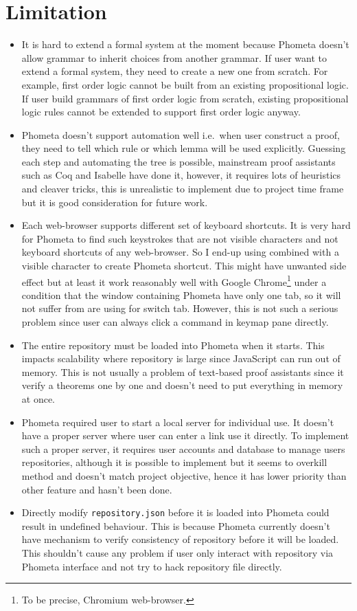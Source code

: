 \documentclass[master.tex]{subfiles}
\begin{document}
\section{Limitation}

\begin{itemize}
\item It is hard to extend a formal system at the moment because Phometa doesn't
  allow grammar to inherit choices from another grammar. If user want to extend
  a formal system, they need to create a new one from scratch. For example,
  first order logic cannot be built from an existing propositional logic. If
  user build grammars of first order logic from scratch, existing propositional
  logic rules cannot be extended to support first order logic anyway.
\item Phometa doesn't support automation well i.e.\ when user construct a proof,
  they need to tell which rule or which lemma will be used explicitly. Guessing
  each step and automating the tree is possible, mainstream proof assistants
  such as Coq and Isabelle have done it, however, it requires lots of heuristics
  and cleaver tricks, this is unrealistic to implement due to project time
  frame but it is good consideration for future work.
\item Each web-browser supports different set of keyboard shortcuts. It is very
  hard for Phometa to find such keystrokes that are not visible characters and
  not keyboard shortcuts of any web-browser. So I end-up using 
  combined with a visible character to create Phometa shortcut. This might have
  unwanted side effect but at least it work reasonably well with Google
  Chrome\footnote{To be precise, Chromium web-browser.} under a condition that
  the window containing Phometa have only one tab, so it will not suffer from
   are using for switch tab. However, this is not such a
  serious problem since user can always click a command in keymap pane directly.
\item The entire repository must be loaded into Phometa when it starts. This
  impacts scalability where repository is large since JavaScript can run out of
  memory. This is not usually a problem of text-based proof assistants since it
  verify a theorems one by one and doesn't need to put everything in memory at
  once.
\item Phometa required user to start a local server for individual use. It
  doesn't have a proper server where user can enter a link use it directly. To
  implement such a proper server, it requires user accounts and database to
  manage users repositories, although it is possible to implement but it seems
  to overkill method and doesn't match project objective, hence it has lower
  priority than other feature and hasn't been done.
\item Directly modify \texttt{repository.json} before it is loaded into Phometa
  could result in undefined behaviour. This is because Phometa currently doesn't
  have mechanism to verify consistency of repository before it will be loaded.
  This shouldn't cause any problem if user only interact with repository via
  Phometa interface and not try to hack repository file directly.
\end{itemize}
\end{document}
